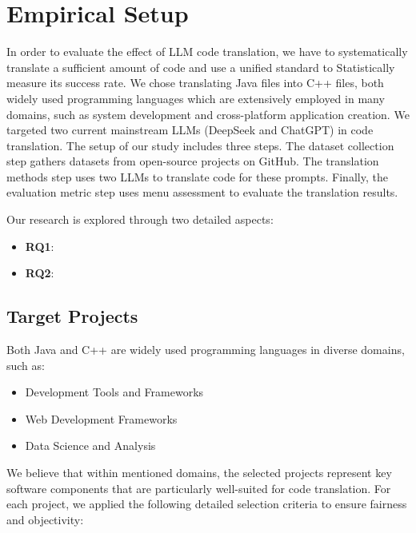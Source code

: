 \section{Empirical Setup}
In order to evaluate the effect of LLM code translation, we have to systematically translate a sufficient amount of code and use a unified standard to Statistically measure its success rate.
We chose translating Java files into C++ files, both widely used programming languages which are extensively employed in many domains, such as system development and cross-platform application creation. We targeted two current mainstream LLMs (DeepSeek and ChatGPT) in code translation. The setup of our study includes three steps. The dataset collection step gathers datasets from open-source projects on GitHub. The translation methods step uses two LLMs to translate code for these prompts. Finally, the evaluation metric step uses menu assessment to evaluate the translation results.


Our research is explored through two detailed aspects:

\begin{itemize}
    \item \textbf{RQ1}: 
    \item \textbf{RQ2}: 
\end{itemize}


\subsection{Target Projects}

Both Java and C++ are widely used programming languages in diverse domains, such as:

\begin{itemize}
    \item Development Tools and Frameworks
    \item Web Development Frameworks
    \item Data Science and Analysis
\end{itemize}

We believe that within mentioned domains, the selected projects represent key software components that are particularly well-suited for code translation. For each project, we applied the following detailed selection criteria to ensure fairness and objectivity:

